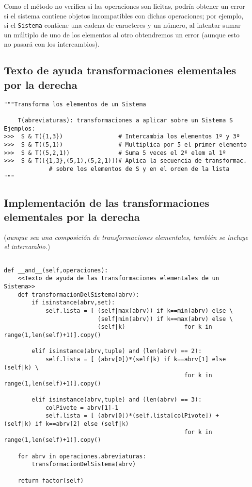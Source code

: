 \documentclass[11pt]{report}
\begin{document}
Como el método no verifica si las operaciones son licitas, podría
obtener un error si el sistema contiene objetos incompatibles con
dichas operaciones; por ejemplo, si el \texttt{Sistema} contiene una cadena
de caracteres y un número, al intentar sumar un múltiplo de uno de los
elementos al otro obtendremos un error (aunque esto no pasará con los
intercambios).

\subsection{Texto de ayuda transformaciones elementales por la derecha}
\label{sec:org17e75ae}

\begin{verbatim}
"""Transforma los elementos de un Sistema 

    T(abreviaturas): transformaciones a aplicar sobre un Sistema S
Ejemplos:
>>>  S & T({1,3})                # Intercambia los elementos 1º y 3º
>>>  S & T((5,1))                # Multiplica por 5 el primer elemento
>>>  S & T((5,2,1))              # Suma 5 veces el 2º elem al 1º
>>>  S & T([{1,3},(5,1),(5,2,1)])# Aplica la secuencia de transformac.
             # sobre los elementos de S y en el orden de la lista
"""
\end{verbatim}

\subsection{Implementación de las transformaciones elementales por la derecha}
\label{sec:orge0fb8d2}

(\emph{aunque sea una composición de transformaciones elementales, también
se incluye el intercambio.})

\begin{verbatim}

def __and__(self,operaciones):
    <<Texto de ayuda de las transformaciones elementales de un Sistema>>
    def transformacionDelSistema(abrv):
        if isinstance(abrv,set):
            self.lista = [ (self|max(abrv)) if k==min(abrv) else \
                           (self|min(abrv)) if k==max(abrv) else \
                           (self|k)                 for k in range(1,len(self)+1)].copy()
            
        elif isinstance(abrv,tuple) and (len(abrv) == 2):
            self.lista = [ (abrv[0])*(self|k) if k==abrv[1] else (self|k) \
                                                    for k in range(1,len(self)+1)].copy()

        elif isinstance(abrv,tuple) and (len(abrv) == 3):
            colPivote = abrv[1]-1
            self.lista = [ (abrv[0])*(self.lista[colPivote]) + (self|k) if k==abrv[2] else (self|k)
                                                    for k in range(1,len(self)+1)].copy()

    for abrv in operaciones.abreviaturas:
        transformacionDelSistema(abrv)

    return factor(self)
        
\end{verbatim}
\end{document}
